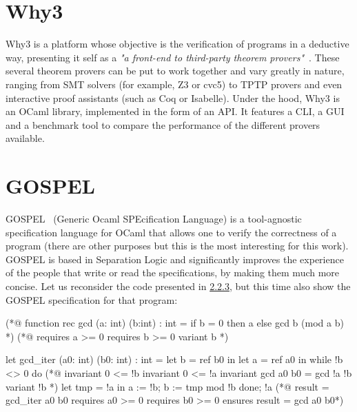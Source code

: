 \section{Why3}
\label{sec:why3}

Why3 is a platform whose objective is the verification of programs in a deductive way, presenting it self as a \emph{"a front-end to third-party theorem provers"}~\cite{why3}.
These several theorem provers can be put to work together and vary greatly in nature, ranging from SMT solvers (for example, Z3 or cvc5) to TPTP provers and even interactive proof assistants (such as Coq or Isabelle).
Under the hood, Why3 is an OCaml library, implemented in the form of an API.
It features a CLI, a GUI and a benchmark tool to compare the performance of the different provers available.


\section{GOSPEL}
\label{sec:gospel}

GOSPEL~\cite{DBLP:conf/fm/ChargueraudFLP19} (Generic Ocaml SPEcification Language) is a tool-agnostic specification language for OCaml that allows one to verify the correctness of a program (there are other purposes but this is the most interesting for this work).
GOSPEL is based in Separation Logic and significantly improves the experience of the people that write or read the specifications, by making them much more concise.
Let us reconsider the code presented in \hyperref[sub:examples_ocaml]{2.2.3}, but this time also show the GOSPEL specification for that program:

\begin{gospel}
  (*@ function rec gcd (a: int) (b:int) : int =
      if b = 0 then a
      else gcd b (mod a b) *)
  (*@ requires a >= 0
      requires b >= 0
      variant b *)
\end{gospel}

\begin{gospel}
  let gcd_iter (a0: int) (b0: int) : int =
    let b = ref b0 in
    let a = ref a0 in
    while !b <> 0 do
        (*@ invariant 0 <= !b
            invariant 0 <= !a
            invariant gcd a0 b0 = gcd !a !b
            variant !b *)
        let tmp = !a in
        a := !b;
        b := tmp mod !b
    done;
    !a
  (*@ result = gcd_iter a0 b0
      requires a0 >= 0
      requires b0 >= 0
      ensures result = gcd a0 b0*)
\end{gospel}

